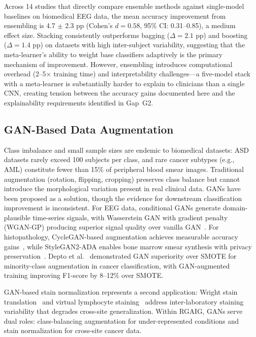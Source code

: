 Across 14 studies that directly compare ensemble methods against single-model baselines on biomedical EEG data, the mean accuracy improvement from ensembling is 4.7 $\pm$ 2.3 pp (Cohen's $d = 0.58$, 95\% CI: 0.31--0.85), a medium effect size. Stacking consistently outperforms bagging ($\Delta = 2.1$ pp) and boosting ($\Delta = 1.4$ pp) on datasets with high inter-subject variability, suggesting that the meta-learner's ability to weight base classifiers adaptively is the primary mechanism of improvement. However, ensembling introduces computational overhead (2--5$\times$ training time) and interpretability challenges---a five-model stack with a meta-learner is substantially harder to explain to clinicians than a single CNN, creating tension between the accuracy gains documented here and the explainability requirements identified in Gap~G2.

\subsection{GAN-Based Data Augmentation}

Class imbalance and small sample sizes are endemic to biomedical datasets: ASD datasets rarely exceed 100 subjects per class, and rare cancer subtypes (e.g., AML) constitute fewer than 15\% of peripheral blood smear images. Traditional augmentation (rotation, flipping, cropping) preserves class balance but cannot introduce the morphological variation present in real clinical data. GANs have been proposed as a solution, though the evidence for downstream classification improvement is inconsistent. For EEG data, conditional GANs generate domain-plausible time-series signals, with Wasserstein GAN with gradient penalty (WGAN-GP) producing superior signal quality over vanilla GAN~\cite{lashgari2020augmentation}. For histopathology, CycleGAN-based augmentation achieves measurable accuracy gains~\cite{bai2022cyclegan}, while StyleGAN2-ADA enables bone marrow smear synthesis with privacy preservation~\cite{eckardt2025stylegan}. Depto et al.~\cite{depto2023gansmote} demonstrated GAN superiority over SMOTE for minority-class augmentation in cancer classification, with GAN-augmented training improving F1-score by 8--12\% over SMOTE.

GAN-based stain normalization represents a second application: Wright stain translation~\cite{huang2023staingan} and virtual lymphocyte staining~\cite{wolflein2023hoechst} address inter-laboratory staining variability that degrades cross-site generalization. Within RGAIG, GANs serve dual roles: class-balancing augmentation for under-represented conditions and stain normalization for cross-site cancer data.

